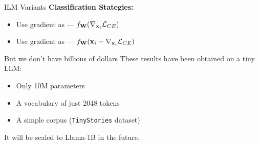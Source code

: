 \begin{frame}{ILM Variants}
    \pause
    \vspace{0.5cm}
    \textbf{Classification Stategies:}
    \pause
    \begin{itemize}
        \item Use gradient as  --- $f_{\mathbf{W}}(\nabla_{\mathbf{x}_i}\mathcal{L}_{CE})$
        \pause
        \item Use gradient as  --- $f_{\mathbf{W}}(\mathbf{x}_i - \nabla_{\mathbf{x}_i}\mathcal{L}_{CE})$
    \end{itemize}
\end{frame}




\begin{frame}{But we don't have billions of dollars}
    These results have been obtained on a tiny LLM:
    \begin{itemize}
        \item Only 10M parameters
        \item A vocabulary of just 2048 tokens
        \item A simple corpus (\texttt{TinyStories} dataset)
    \end{itemize}

    \vfill
    It will be scaled to Llama-1B in the future.
\end{frame}
